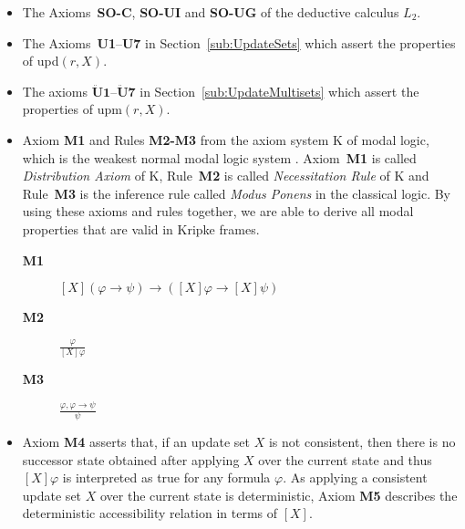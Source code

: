 \documentclass[preprint,11pt]{elsarticle}
\theoremstyle{definition}
\theoremstyle{remark}
\begin{document}
\begin{itemize}

\item The Axioms~\textbf{SO-C}, \textbf{SO-UI} and \textbf{SO-UG} of the deductive calculus $L_2$.

\smallskip

\item The Axioms~\textbf{U1}--\textbf{U7} in Section~\ref{sub:UpdateSets} which assert the properties of upd$(r, X)$.

\smallskip

\item The axioms $\mathbf{\ddot{U}1}$--$\mathbf{\ddot{U}7}$ in Section~\ref{sub:UpdateMultisets} which assert the properties of upm$(r, X)$.

\smallskip

\item Axiom \textbf{M1} and Rules \textbf{M2-M3} from the axiom system K of modal logic, which is the weakest
normal modal logic system \cite{hughes:modallogic1996}. Axiom~\textbf{M1} is called \emph{Distribution Axiom} of K,
Rule~\textbf{M2} is called \emph{Necessitation Rule} of K and Rule~\textbf{M3} is the inference rule called \emph{Modus Ponens} in the
classical logic. By using these axioms and rules together, we are able to derive all modal properties that are valid in Kripke frames.

\begin{description}

  \item[\textbf{M1}] $[X](\varphi\rightarrow\psi)\rightarrow ([X]\varphi\rightarrow[X]\psi)$\smallskip

  \item[\textbf{M2}] $\frac{\varphi}{[X]\varphi}$ \smallskip

  \item[\textbf{M3}] $\frac{\varphi, \varphi\rightarrow\psi}{\psi}$\smallskip
\end{description}

\item Axiom \textbf{M4} asserts that, if an update set $X$ is not consistent, then
there is no successor state obtained after applying $X$ over
the current state and thus $[X]\varphi$ is interpreted as true
for any formula $\varphi$. As applying a consistent update set $X$
over the current state is deterministic, Axiom \textbf{M5} describes
the deterministic accessibility relation in terms of $[X]$.

\begin{description}


\end{description}
\end{itemize}
\end{document}
